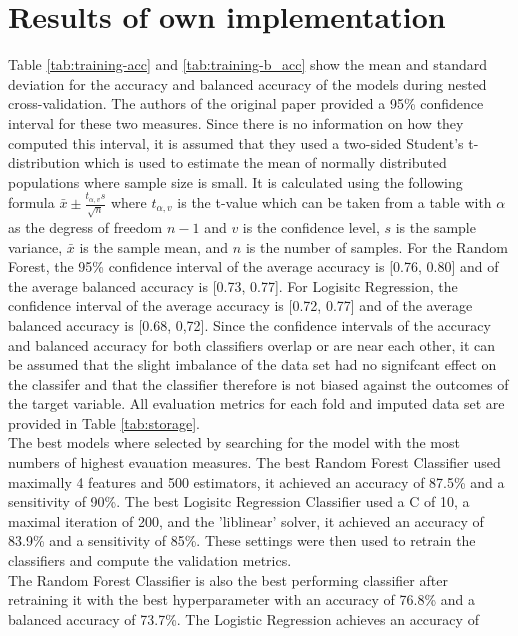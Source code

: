 \section{Results of own implementation}
Table \ref{tab:training-acc} and \ref{tab:training-b_acc} show the mean and 
standard deviation for the accuracy and balanced accuracy of the models during 
nested cross-validation. The authors of the original paper provided a 95\% 
confidence interval for these two measures. Since there is no information on 
how they computed this interval, it is assumed that they used a two-sided 
Student's t-distribution which is used to estimate the mean of normally 
distributed populations where sample size is small. It is calculated using the 
following formula $\bar{x} \pm \frac{t_{\alpha, v}s}{\sqrt{n}}$ where 
$t_{\alpha, v}$ is the t-value which can be taken from a table with $\alpha$ 
as the degress of freedom $n-1$ and $v$ is the confidence level, $s$ is the 
sample variance, $\bar{x}$ is the sample mean, and $n$ is the number of samples.
For the Random Forest, the 95\% confidence interval of the average accuracy is 
[0.76, 0.80] and of the average balanced accuracy is [0.73, 0.77]. For Logisitc 
Regression, the confidence interval of the average accuracy is [0.72, 0.77] and 
of the average balanced accuracy is [0.68, 0,72]. Since the confidence 
intervals of the accuracy and balanced accuracy for both classifiers overlap or 
are near each other, it can be assumed that the slight imbalance of the data 
set had no signifcant effect on the classifer and that the classifier therefore 
is not biased against the outcomes of the target variable. All evaluation 
metrics for each fold and imputed data set are provided in Table 
\ref{tab:storage}.
\\
The best models where selected by searching for the model with the most numbers 
of highest evauation measures. The best Random Forest Classifier used maximally 
4 features and 500 estimators, it achieved an accuracy of 87.5\% and a 
sensitivity of 90\%. The best Logisitc Regression Classifier used a C of 10, a 
maximal iteration of 200, and the 'liblinear' solver, it achieved an accuracy 
of 83.9\% and a sensitivity of 85\%. These settings were then used to retrain 
the classifiers and compute the validation metrics.
\\
The Random Forest Classifier is also the best performing classifier after 
retraining it with the best hyperparameter with an accuracy of 76.8\% and a 
balanced accuracy of 73.7\%. The Logistic Regression achieves an accuracy of 
